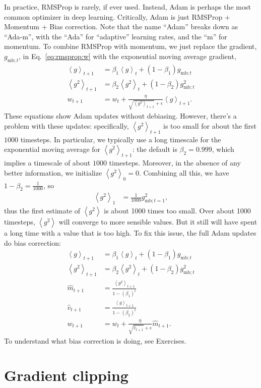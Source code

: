 \documentclass{article}
\newcommand{\bracket}[3]{\left#1 #3 \right#2}
\newcommand{\ab}{\bracket{\langle}{\rangle}}
\newcommand{\0}{\mathbf{0}}
\newcommand{\gsmbt}{g_{\text{mb}; t}}
\newcommand{\vh}{\hat{v}}
\newcommand{\mh}{\hat{m}}
\newcommand{\gssqb}{\ab{g^2}}
\newcommand{\gsb}{\ab{g}}
\begin{document}
In practice, RMSProp is rarely, if ever used.
Instead, Adam is perhaps the most common optimizer in deep learning.
Critically, Adam is just RMSProp + Momentum + Bias correction.
Note that the name ``Adam'' breaks down as ``Ada-m'', with the ``Ada'' for ``adaptive'' learning rates, and the ``m'' for momentum.
To combine RMSProp with momentum, we just replace the gradient, $\gsmbt$, in Eq.~\eqref{eq:rmsprop:w} with the exponential moving average gradient, 
\begin{align}
  \gsb_{t+1} &= \beta_1 \gsb_{t} + (1-\beta_1) \gsmbt\\
  \gssqb_{t+1} &= \beta_2 \gssqb_{t} + (1-\beta_2) \gsmbt^2\\
  w_{t+1} &= w_t + \frac{\eta}{\sqrt{\gssqb_{t+1}} + \epsilon}\gsb_{t+1}.
\end{align}
These equations show Adam updates without debiasing.
However, there's a problem with these updates: specifically, $\gssqb_{t+1}$ is too small for about the first $1000$ timesteps.
In particular, we typically use a long timescale for the exponential moving average for $\gssqb_{t+1}$: the default is $\beta_2 = 0.999$, which implies a timescale of about $1000$ timesteps.
Moreover, in the absence of any better information, we initialize $\gssqb_0 = 0$.
Combining all this, we have $1-\beta_2 = \tfrac{1}{1000}$, so
\begin{align}
  \gssqb_1 &= \tfrac{1}{1000} g_{\text{mb}; t=1}^2,
\end{align}
thus the first estimate of $\gssqb$ is about 1000 times too small.
Over about 1000 timesteps, $\gssqb$ will converge to more sensible values.
But it still will have spent a long time with a value that is too high.
To fix this issue, the full Adam updates do bias correction:
\begin{align}
  \gsb_{t+1} &= \beta_1 \gsb_{t} + (1-\beta_1) \gsmbt\\
  \gssqb_{t+1} &= \beta_2 \gssqb_{t} + (1-\beta_2) \gsmbt^2\\
  \mh_{t+1} &= \frac{\gssqb_{t+1}}{1-(\beta_1)^t}\\
  \vh_{t+1} &= \frac{\gsb_{t+1}}{1-(\beta_2)^t}\\
  w_{t+1} &= w_t + \frac{\eta}{\sqrt{\vh_{t+1}} + \epsilon}\mh_{t+1}.
\end{align}
To understand what bias correction is doing, see Exercises.

\section{Gradient clipping}
\end{document}
